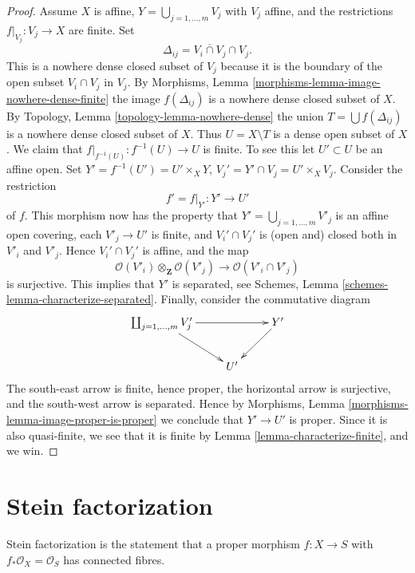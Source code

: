 \begin{proof}
\medskip\noindent
Assume $X$ is affine, $Y = \bigcup_{j = 1, \ldots, m} V_j$ with $V_j$ affine,
and the restrictions $f|_{V_j} : V_j \to X$ are finite.
Set
$$
\Delta_{ij} = \overline{V_i \cap V_j} \cap V_j.
$$
This is a nowhere dense closed subset of $V_j$ because it is the boundary
of the open subset $V_i \cap V_j$ in $V_j$. By
Morphisms, Lemma \ref{morphisms-lemma-image-nowhere-dense-finite}
the image $f(\Delta_{ij})$ is a nowhere dense closed subset of $X$. By
Topology, Lemma \ref{topology-lemma-nowhere-dense}
the union $T = \bigcup f(\Delta_{ij})$ is a nowhere dense closed
subset of $X$. Thus $U = X \setminus T$ is a dense open subset of $X$.
We claim that $f|_{f^{-1}(U)} : f^{-1}(U) \to U$ is finite.
To see this let $U' \subset U$ be an affine open.
Set $Y' = f^{-1}(U') = U' \times_X Y$,
$V_j' = Y' \cap V_j = U' \times_X V_j$. Consider the restriction
$$
f' = f|_{Y'} : Y' \longrightarrow U'
$$
of $f$. This morphism now has the property that
$Y' = \bigcup_{j = 1, \ldots, m} V'_j$ is an affine open covering,
each $V'_j \to U'$ is finite, and $V_i' \cap V_j'$ is (open and) closed
both in $V'_i$ and $V'_j$. Hence $V_i' \cap V_j'$ is affine, and the map
$$
\mathcal{O}(V'_i) \otimes_{\mathbf{Z}} \mathcal{O}(V'_j)
\longrightarrow
\mathcal{O}(V'_i \cap V'_j)
$$
is surjective. This implies that $Y'$ is separated, see
Schemes, Lemma \ref{schemes-lemma-characterize-separated}.
Finally, consider the commutative diagram
$$
\xymatrix{
\coprod_{j = 1, \ldots, m} V'_j \ar[rd] \ar[rr] & & Y' \ar[ld] \\
& U' &
}
$$
The south-east arrow is finite, hence proper, the horizontal arrow is
surjective, and the south-west arrow is separated. Hence by
Morphisms, Lemma \ref{morphisms-lemma-image-proper-is-proper}
we conclude that $Y' \to U'$ is proper. Since it is also quasi-finite,
we see that it is finite by Lemma \ref{lemma-characterize-finite},
and we win.
\end{proof}


\section{Stein factorization}
\label{section-stein-factorization}

\noindent
Stein factorization is the statement that a proper morphism $f : X \to S$
with $f_*\mathcal{O}_X = \mathcal{O}_S$ has connected fibres.

